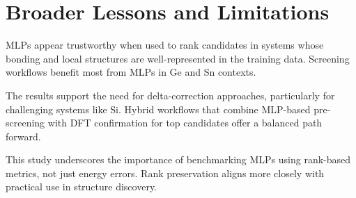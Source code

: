 \section{Broader Lessons and Limitations} \label{section:broader_lessons_and_limitations}

MLPs appear trustworthy when used to rank candidates in systems whose bonding and local structures are well-represented in the training data. Screening workflows benefit most from MLPs in Ge and Sn contexts.

The results support the need for delta-correction approaches, particularly for challenging systems like Si. Hybrid workflows that combine MLP-based pre-screening with DFT confirmation for top candidates offer a balanced path forward.


This study underscores the importance of benchmarking MLPs using rank-based metrics, not just energy errors. Rank preservation aligns more closely with practical use in structure discovery.